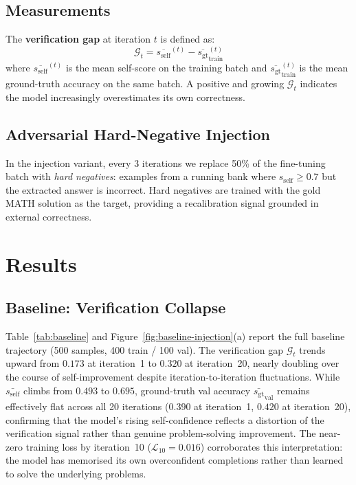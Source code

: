 \documentclass{article}
\newcommand{\gap}{\mathcal{G}}          %
\newcommand{\self}{s_{\text{self}}}     %
\newcommand{\gt}{s_{\text{gt}}}         %
\begin{document}
\subsection{Measurements}

The \textbf{verification gap} at iteration $t$ is defined as:
\begin{equation}
  \gap_t = \overline{\self}^{(t)} - \overline{\gt}_{\text{train}}^{(t)}
  \label{eq:gap}
\end{equation}
where $\overline{\self}^{(t)}$ is the mean self-score on the training batch
and $\overline{\gt}_{\text{train}}^{(t)}$ is the mean ground-truth accuracy
on the same batch. A positive and growing $\gap_t$ indicates the model
increasingly overestimates its own correctness.

\subsection{Adversarial Hard-Negative Injection}

In the injection variant, every 3 iterations we replace 50\% of the
fine-tuning batch with \emph{hard negatives}: examples from a running bank
where $\self \geq 0.7$ but the extracted answer is incorrect. Hard negatives
are trained with the gold MATH solution as the target, providing a
recalibration signal grounded in external correctness.

\section{Results}
\label{sec:results}

\subsection{Baseline: Verification Collapse}

Table~\ref{tab:baseline} and Figure~\ref{fig:baseline-injection}(a) report
the full baseline trajectory (500 samples, 400 train / 100 val).
The verification gap $\gap_t$ trends upward from $0.173$ at iteration~1
to $0.320$ at iteration~20, nearly doubling over the course of
self-improvement despite iteration-to-iteration fluctuations.
While $\bar{\self}$ climbs from $0.493$ to $0.695$, ground-truth val accuracy
$\bar{\gt}_\text{val}$ remains effectively flat across all 20 iterations
($0.390$ at iteration~1, $0.420$ at iteration~20), confirming that the
model's rising self-confidence reflects a distortion of the verification
signal rather than genuine problem-solving improvement.
The near-zero training loss by iteration~10 ($\mathcal{L}_{10} = 0.016$)
corroborates this interpretation: the model has memorised its own overconfident
completions rather than learned to solve the underlying problems.
\end{document}
